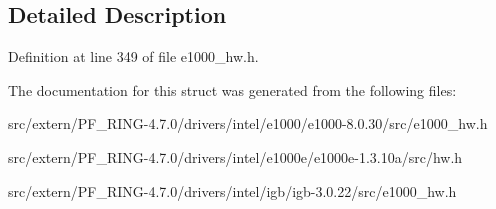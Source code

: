 

\subsection{Detailed Description}


Definition at line 349 of file e1000\_\-hw.h.



The documentation for this struct was generated from the following files:\begin{DoxyCompactItemize}
\item 
src/extern/PF\_\-RING-\/4.7.0/drivers/intel/e1000/e1000-\/8.0.30/src/e1000\_\-hw.h\item 
src/extern/PF\_\-RING-\/4.7.0/drivers/intel/e1000e/e1000e-\/1.3.10a/src/hw.h\item 
src/extern/PF\_\-RING-\/4.7.0/drivers/intel/igb/igb-\/3.0.22/src/e1000\_\-hw.h\end{DoxyCompactItemize}
